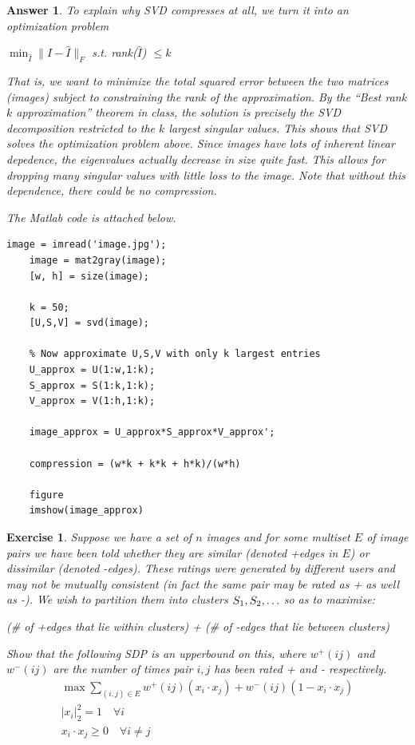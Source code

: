 \documentclass[12pt]{article}
\theoremstyle{colon}
\newtheorem{exercise}{Exercise}
\newtheorem*{answer}{Answer}
\begin{document}
\begin{answer}
  To explain why SVD compresses at all, we turn it into an optimization problem

  \begin{center}
    $\min_{\widehat{I}} \lVert I - \widehat{I} \rVert_F$ s.t. rank($\widehat{I}$) $\leq k$
  \end{center}

  That is, we want to minimize the total squared error between the two matrices (images) subject to constraining the rank of the approximation. By the ``Best rank $k$ approximation'' theorem in class, the solution is precisely the SVD decomposition restricted to the $k$ largest singular values. This shows that SVD solves the optimization problem above. Since images have lots of inherent linear depedence, the eigenvalues actually decrease in size quite fast. This allows for dropping many singular values with little loss to the image. Note that without this dependence, there could be no compression.

  The Matlab code is attached below.

  \begin{lstlisting}[style=Matlab-editor, basicstyle=\scriptsize]
    image = imread('image.jpg');
    image = mat2gray(image);
    [w, h] = size(image);

    k = 50;
    [U,S,V] = svd(image);

    % Now approximate U,S,V with only k largest entries
    U_approx = U(1:w,1:k);
    S_approx = S(1:k,1:k);
    V_approx = V(1:h,1:k);

    image_approx = U_approx*S_approx*V_approx';

    compression = (w*k + k*k + h*k)/(w*h)

    figure
    imshow(image_approx)
  \end{lstlisting}
\end{answer}

\clearpage

\begin{exercise}
  Suppose we have a set of $n$ images and for some multiset $E$ of image pairs we have been told whether they are \textit{similar} (denoted +edges in $E$) or \textit{dissimilar} (denoted -edges). These ratings were generated by different users and may not be mutually consistent (in fact the same pair may be rated as + as well as -). We wish to \textit{partition} them into clusters $S_1, S_2, \mathellipsis$ so as to maximise:
  \begin{center}
    (\# of +edges that lie within clusters) + (\# of -edges that lie between clusters)
  \end{center}
  Show that the following SDP is an upperbound on this, where $w^+(ij)$ and $w^-(ij)$ are the number of times pair $i,j$ has been rated + and - respectively.
  \begin{gather*}
    \max \sum_{(i,j) \in E} w^+(ij)(x_i \cdot x_j) + w^-(ij)(1 - x_i \cdot x_j) \\
    \lvert x_i \rvert_2^2 = 1 \quad \forall i \\
    x_i \cdot x_j \geq 0 \quad \forall i \neq j
  \end{gather*}
\end{exercise}
\end{document}
